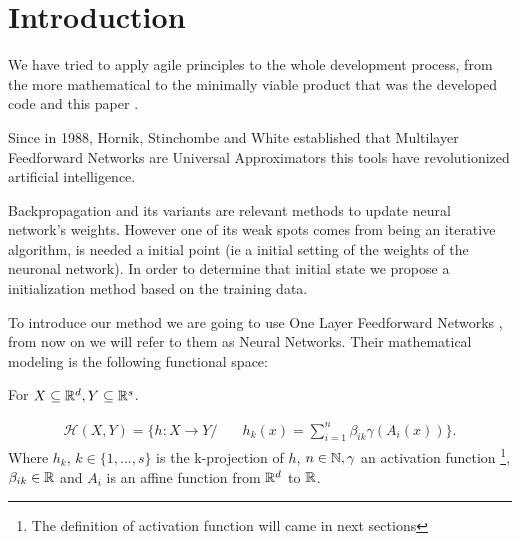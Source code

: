 \section*{Introduction} %

We have tried to apply agile principles to the whole development process, from
the more mathematical to the minimally viable product that was the developed
code and this paper \cite{DBLP:journals/corr/abs-2104-12545}.

Since in 1988, Hornik, Stinchombe and White established
that Multilayer Feedforward Networks are Universal Approximators \cite{HORNIK1989359} this tools have revolutionized artificial intelligence. 

Backpropagation \cite{backpropagation-Hinton} and its 
variants are relevant methods to update neural 
network's weights. However one of its weak spots comes from being an iterative 
algorithm, is needed a initial point (ie a initial setting of the weights of the neuronal network). In order to determine that initial state we propose a initialization method based on the training data. 

To introduce our method we are going to use One Layer
Feedforward Networks \cite{HORNIK1989359} , from now on we will refer to them as Neural Networks. Their mathematical modeling is the following functional space: 

    For $X \subseteq \mathbb{R}^d, Y \subseteq \mathbb{R}^s$. 

    \begin{align} \label{nn_functional_space}
        \mathcal{H}(X,Y) 
        =
        \{
            h : X \longrightarrow Y 
            /& \quad 
            h_k(x) = 
            \sum_{i=1}^{n} \beta_{i k} \gamma( A_{i}(x))          
        \}.
    \end{align}
    Where $h_k$, $k \in \{1, \ldots, s\}$ is the k-projection of $h$, 
    $n \in \mathbb{N},\gamma$ an activation function 
    \footnote{The definition of activation function will came in next sections }, $\beta_{i k} \in \mathbb{R}$ and $A_{i}$ is an affine function from $\mathbb{R}^d$ to $\mathbb{R}$. 

